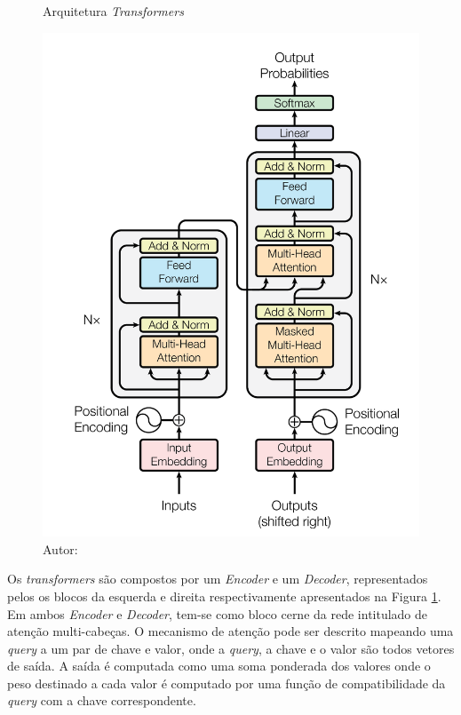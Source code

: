 \begin{figure}[htbp]
    \centering
    \caption{Arquitetura \textit{Transformers}}
    \includegraphics[scale=0.6]{figures/fig004.png}
    \caption*{Autor: }
    \label{fig:fig004}
\end{figure}

Os \textit{transformers} são compostos por um \textit{Encoder} e um \textit{Decoder}, representados pelos os blocos da esquerda e direita respectivamente apresentados na Figura \ref{fig:fig004}. Em ambos \textit{Encoder} e \textit{Decoder}, tem-se como bloco cerne da rede intitulado de atenção multi-cabeças. O mecanismo de atenção pode ser descrito mapeando uma \textit{query} a um par de chave e valor, onde a \textit{query}, a chave e o valor são todos vetores de saída. A saída é computada como uma soma ponderada dos valores onde o peso destinado a cada valor é computado por uma função de compatibilidade da \textit{query} com a chave correspondente.

